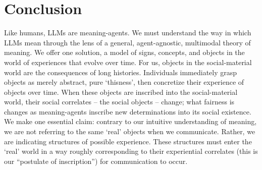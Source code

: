 \section{Conclusion}\label{sec:conclusion}

Like humans, LLMs are meaning-agents. We must understand the way in which LLMs mean through the lens of a general, agent-agnostic, multimodal theory of meaning. We offer one solution, a model of signs, concepts, and objects in the world of experiences that evolve over time. For us, objects in the social-material world are the consequences of long histories. Individuals immediately grasp objects as merely abstract, pure `thisness', then concretize their experience of objects over time. When these objects are inscribed into the social-material world, their social correlates -- the social objects -- change; what fairness is changes as meaning-agents inscribe new determinations into its social existence. We make one essential claim: contrary to our intuitive understanding of meaning, we are not referring to the same `real' objects when we communicate. Rather, we are indicating structures of possible experience. These structures must enter the `real' world in a way roughly corresponding to their experiential correlates (this is our ``postulate of inscription'') for communication to occur.

